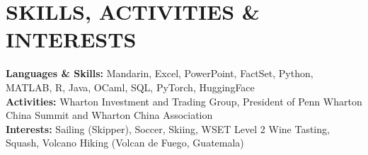 \documentclass[10pt,letterpaper]{article}
\newcommand{\ressection}[1]{\section*{#1}}
\begin{document}
\ressection{SKILLS, ACTIVITIES \& INTERESTS}

\textbf{Languages \& Skills:} Mandarin, Excel, PowerPoint, FactSet, Python, MATLAB, R, Java, OCaml, SQL, PyTorch, HuggingFace \\
\textbf{Activities:} Wharton Investment and Trading Group, President of Penn Wharton China Summit and Wharton China Association\\
\textbf{Interests:} Sailing (Skipper), Soccer, Skiing, WSET Level 2 Wine Tasting, Squash, Volcano Hiking (Volcan de Fuego, Guatemala)
\end{document}
